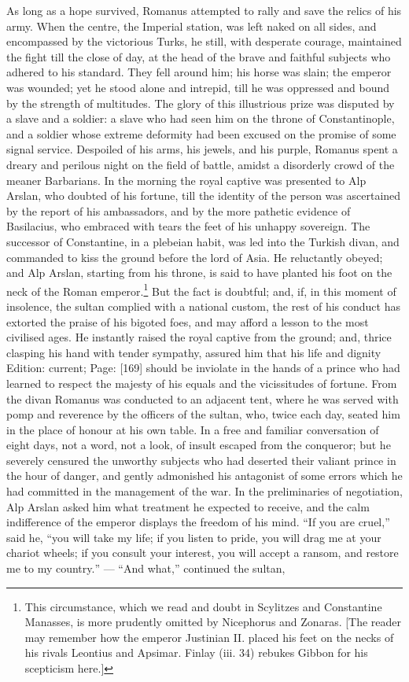 As long as a hope survived, Romanus attempted to rally and save the relics of his army. When the centre, the Imperial station, was left naked on all sides, and encompassed by the victorious Turks, he still, with desperate courage, maintained the fight till the close of day, at the head of the brave and faithful subjects who adhered to his standard. They fell around him; his horse was slain; the emperor was wounded; yet he stood alone and intrepid, till he was oppressed and bound by the strength of multitudes. The glory of this illustrious prize was disputed by a slave and a soldier: a slave who had seen him on the throne of Constantinople, and a soldier whose extreme deformity had been excused on the promise of some signal service. Despoiled of his arms, his jewels, and his purple, Romanus spent a dreary and perilous night on the field of battle, amidst a disorderly crowd of the meaner Barbarians. In the morning the royal captive was presented to Alp Arslan, who doubted of his fortune, till the identity of the person was ascertained by the report of his ambassadors, and by the more pathetic evidence of Basilacius, who embraced with tears the feet of his unhappy sovereign. The successor of Constantine, in a plebeian habit, was led into the Turkish divan, and commanded to kiss the ground before the lord of Asia. He reluctantly obeyed; and Alp Arslan, starting from his throne, is said to have planted his foot on the neck of the Roman emperor.\footnote{This circumstance, which we read and doubt in Scylitzes and Constantine Manasses, is more prudently omitted by Nicephorus and Zonaras. [The reader may remember how the emperor Justinian II. placed his feet on the necks of his rivals Leontius and Apsimar. Finlay (iii. 34) rebukes Gibbon for his scepticism here.]} But the fact is doubtful; and, if, in this moment of insolence, the sultan complied with a national custom, the rest of his conduct has extorted the praise of his bigoted foes, and may afford a lesson to the most civilised ages. He instantly raised the royal captive from the ground; and, thrice clasping his hand with tender sympathy, assured him that his life and dignity Edition: current; Page: [169] should be inviolate in the hands of a prince who had learned to respect the majesty of his equals and the vicissitudes of fortune. From the divan Romanus was conducted to an adjacent tent, where he was served with pomp and reverence by the officers of the sultan, who, twice each day, seated him in the place of honour at his own table. In a free and familiar conversation of eight days, not a word, not a look, of insult escaped from the conqueror; but he severely censured the unworthy subjects who had deserted their valiant prince in the hour of danger, and gently admonished his antagonist of some errors which he had committed in the management of the war. In the preliminaries of negotiation, Alp Arslan asked him what treatment he expected to receive, and the calm indifference of the emperor displays the freedom of his mind. \texthebrew{“}If you are cruel,\texthebrew{}” said he, \texthebrew{“}you will take my life; if you listen to pride, you will drag me at your chariot wheels; if you consult your interest, you will accept a ransom, and restore me to my country.\texthebrew{” — “}And what,\texthebrew{}” continued the sultan, 
